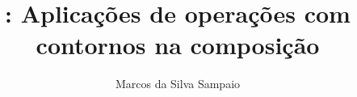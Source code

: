 \documentclass[12pt,brazil]{book}
\title{\obra{}: Aplicações de operações com contornos na composição}
\author{Marcos da Silva Sampaio}
\begin{document}
\graphicspath{{lily/}{figs/}{data/}}

\maketitle
\tableofcontents
\listoftables
\listoffigures




% 

\end{document}
